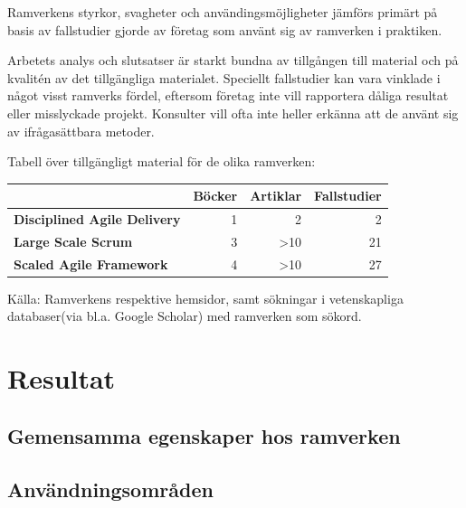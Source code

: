 		Ramverkens styrkor, svagheter och användingsmöjligheter jämförs primärt på basis av fallstudier gjorde av företag som använt sig av ramverken i praktiken.
		
		
		
		Arbetets analys och slutsatser är starkt bundna av tillgången till material och på kvalitén av det tillgängliga materialet. Speciellt fallstudier kan vara vinklade i något visst ramverks fördel, eftersom företag inte vill rapportera dåliga resultat eller misslyckade projekt. Konsulter vill ofta inte heller erkänna att de använt sig av ifrågasättbara metoder.
		
		
		Tabell över tillgängligt material för de olika ramverken:
	
		\begin{center}
		\begin{tabular}{ >{\bfseries}l | r | r | r }
			 	 						& Böcker & Artiklar & Fallstudier 	\\ \hline
			Disciplined Agile Delivery 	& 1 	& 2			& 2 			\\ \hline
			Large Scale Scrum 			& 3 	& >10		& 21 			\\ \hline
			Scaled Agile Framework 		& 4 	& >10		& 27 			\\ 
		\end{tabular}
		\end{center}
		
		Källa: Ramverkens respektive hemsidor\cite{dad_web, less_web, safe_web}, samt sökningar i vetenskapliga databaser(via bl.a. Google Scholar) med ramverken som sökord.
		
	
	
\newpage
\section{Resultat}
	
		
	
	\subsection{Gemensamma egenskaper hos ramverken}
		
	
	\subsection{Användningsområden}

